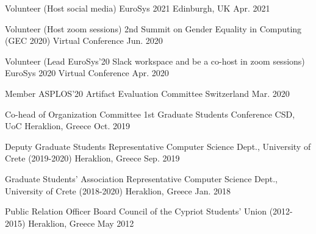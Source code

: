 \begin{cvhonors}
	\cvhonor
	{Volunteer (Host social media)} %
	{EuroSys 2021} %
	{Edinburgh, UK} %
	{Apr. 2021} %

	\cvhonor
	{Volunteer (Host zoom sessions)} %
	{2nd Summit on Gender Equality in Computing (GEC 2020)} %
	{Virtual Conference} %
	{Jun. 2020} %


	\cvhonor
	{Volunteer (Lead EuroSys'20 Slack workspace and be a co-host in
		zoom sessions)} %
	{EuroSys 2020} %
	{Virtual Conference} %
	{Apr. 2020} %


	\cvhonor
	{Member} %
	{ASPLOS'20 Artifact Evaluation Committee} %
	{Switzerland} %
	{Mar. 2020} %

	\cvhonor
	{Co-head of Organization Committee} %
	{1st Graduate Students Conference CSD, UoC} %
	{Heraklion, Greece} %
	{Oct. 2019} %

	\cvhonor
	{Deputy Graduate Students Representative} %
	{Computer Science Dept., University of Crete (2019-2020)} %
	{Heraklion, Greece} %
	{Sep. 2019} %

	\cvhonor
	{Graduate Students' Association Representative} %
	{Computer Science Dept., University of Crete (2018-2020)} %
	{Heraklion, Greece} %
	{Jan. 2018} %

	\cvhonor
	{Public Relation Officer} %
	{Board Council of the Cypriot Students' Union (2012-2015)} %
	{Heraklion, Greece} %
	{May 2012} %

\end{cvhonors}
